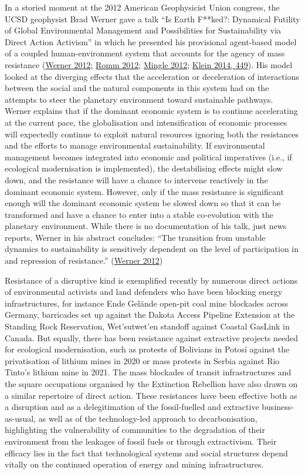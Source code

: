 \documentclass[a4paper, nobind]{templates/ociamthesis}
\begin{document}
In a storied moment at the 2012 American Geophysicist Union congress, the UCSD geophysist Brad Werner gave a talk ``Is Earth F**ked?: Dynamical Futility of Global Environmental Management and Possibilities for Sustainability via Direct Action Activism'' in which he presented his provisional agent-based model of a coupled human-environment system that accounts for the agency of mass resistance (\protect\hyperlink{ref-werner_earth_2012}{Werner 2012}; \protect\hyperlink{ref-romm_agu_2012}{Romm 2012}; \protect\hyperlink{ref-mingle_scientists_2012}{Mingle 2012}; \protect\hyperlink{ref-klein_this_2014}{Klein 2014, 449}). His model looked at the diverging effects that the acceleration or deceleration of interactions between the social and the natural components in this system had on the attempts to steer the planetary environment toward sustainable pathways. Werner explains that if the dominant economic system is to continue accelerating at the current pace, the globalisation and intensification of economic processes will expectedly continue to exploit natural resources ignoring both the resistances and the efforts to manage environmental sustainability. If environmental management becomes integrated into economic and political imperatives (i.e., if ecological modernisation is implemented), the destabilising effects might slow down, and the resistance will have a chance to intervene reactively in the dominant economic system. However, only if the mass resistance is significant enough will the dominant economic system be slowed down so that it can be transformed and have a chance to enter into a stable co-evolution with the planetary environment. While there is no documentation of his talk, just news reports, Werner in his abstract concludes: ``The transition from unstable dynamics to sustainability is sensitively dependent on the level of participation in and repression of resistance.'' (\protect\hyperlink{ref-werner_earth_2012}{Werner 2012})

Resistance of a disruptive kind is exemplified recently by numerous direct actions of environmental activists and land defenders who have been blocking energy infrastructures, for instance Ende Gelände open-pit coal mine blockades across Germany, barricades set up against the Dakota Access Pipeline Extension at the Standing Rock Reservation, Wet'sutwet'en standoff against Coastal GasLink in Canada. But equally, there has been resistance against extractive projects needed for ecological modernisation, such as protests of Bolivians in Potosí against the privatisation of lithium mines in 2020 or mass protests in Serbia against Rio Tinto's lithium mine in 2021. The mass blockades of transit infrastructures and the square occupations organised by the Extinction Rebellion have also drawn on a similar repertoire of direct action. These resistances have been effective both as a disruption and as a delegitimation of the fossil-fuelled and extractive business-as-usual, as well as of the technology-led approach to decarbonisation, highlighting the vulnerability of communities to the degradation of their environment from the leakages of fossil fuels or through extractivism. Their efficacy lies in the fact that technological systems and social structures depend vitally on the continued operation of energy and mining infrastructures.
\end{document}

